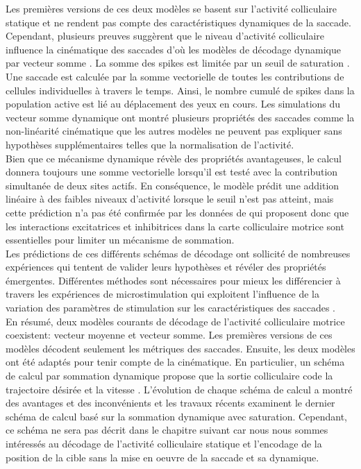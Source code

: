 Les premières versions de ces deux modèles se basent sur l'activité colliculaire statique et ne rendent pas compte des caractéristiques dynamiques de la saccade. Cependant, plusieurs preuves suggèrent que le niveau d'activité colliculaire influence la cinématique des saccades d'o\`u les modèles de décodage dynamique par vecteur somme \cite{Goossens:2006,VanOpstal:2008}. La somme des spikes est limitée par un seuil de saturation \cite{Goossens:2006, Groh:2001}. Une saccade est calculée par la somme vectorielle de toutes les contributions de cellules individuelles à travers le temps. Ainsi, le nombre cumulé de spikes dans la population active est lié au déplacement des yeux en cours. Les simulations du vecteur somme dynamique ont montré plusieurs propriétés des saccades comme la non-linéarité cinématique que les autres modèles ne peuvent pas expliquer sans hypothèses supplémentaires telles que la normalisation de l'activité.\\

Bien que ce mécanisme dynamique révèle des propriétés avantageuses, le calcul donnera toujours une somme vectorielle lorsqu'il est testé avec la contribution simultanée de deux sites actifs. En conséquence, le modèle prédit une addition linéaire à des faibles niveaux d'activité lorsque le seuil n'est pas atteint, mais cette prédiction n'a pas été confirmée par les données de \cite{Katnani:2012} qui proposent donc que les interactions excitatrices et inhibitrices dans la carte colliculaire motrice sont essentielles pour limiter un mécanisme de sommation.\\

Les prédictions de ces différents schémas de décodage ont sollicité de nombreuses expériences qui tentent de valider leurs hypothèses et révéler des propriétés émergentes. Différentes méthodes sont nécessaires pour mieux les différencier à travers les expériences de microstimulation qui exploitent l'influence de la variation des paramètres de stimulation sur les caractéristiques des saccades  \cite{Brecht:2004, Katnani:2010, Katnani:2012}.\\

En résumé, deux modèles courants de décodage de l'activité colliculaire motrice coexistent: vecteur moyenne et vecteur somme. Les premières versions de ces modèles décodent seulement les métriques des saccades. Ensuite, les deux modèles ont été adaptés pour tenir compte de la cinématique. En particulier, un schéma de calcul par sommation dynamique propose que la sortie colliculaire code la trajectoire désirée et la vitesse \cite{Goossens:2006, Groh:2001}. L'évolution de chaque schéma de calcul a montré des avantages et des inconvénients \cite{Gandhi:2011,Katnani:2012} et les travaux récents examinent le dernier schéma de calcul basé sur la sommation dynamique avec saturation. Cependant, ce schéma ne sera pas décrit dans le chapitre suivant car nous nous sommes intéressés au décodage de l'activité colliculaire statique et l'encodage de la position de la cible sans la mise en oeuvre de la saccade et sa dynamique.\\
 








